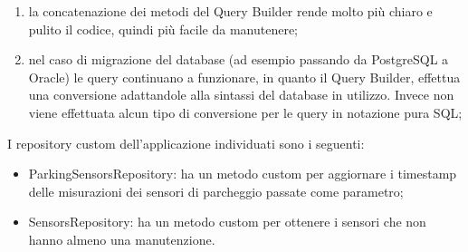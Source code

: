\begin{enumerate}
    \item la concatenazione dei metodi del Query Builder rende molto più chiaro e pulito il codice, quindi più facile
        da manutenere;
    \item nel caso di migrazione del database (ad esempio passando da PostgreSQL a Oracle) le query continuano a funzionare, in 
        quanto il Query Builder,
        effettua una conversione adattandole alla sintassi del database in utilizzo. Invece non viene 
        effettuata alcun tipo di conversione per le query in notazione pura SQL;
\end{enumerate}
\leavevmode\newline
I repository custom dell'applicazione individuati sono i seguenti:
\begin{itemize}
    \item ParkingSensorsRepository: ha un metodo custom per aggiornare i timestamp delle misurazioni dei sensori di parcheggio 
        passate come parametro;
    \item SensorsRepository: ha un metodo custom per ottenere i sensori che non hanno almeno una manutenzione.
\end{itemize}

